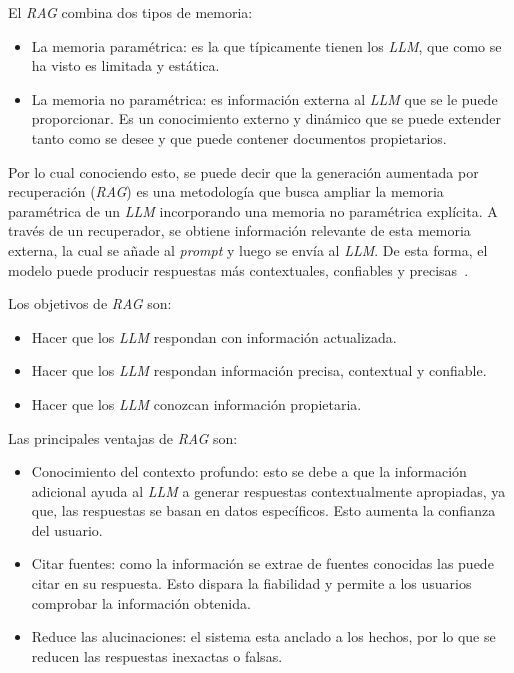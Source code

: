
El \textit{RAG} combina dos tipos de memoria:
\begin{itemize}
\tightlist
	\item La memoria paramétrica: es la que típicamente tienen los \textit{LLM}, que como se ha visto es limitada y estática. 
	\item La memoria no paramétrica: es información externa al \textit{LLM} que se le puede proporcionar. Es un conocimiento externo y dinámico que se puede extender tanto como se desee y que puede contener documentos propietarios.
\end{itemize}

Por lo cual conociendo esto, se puede decir que la generación aumentada por recuperación (\textit{RAG}) es una metodología que busca ampliar la memoria paramétrica de un \textit{LLM} incorporando una memoria no paramétrica explícita. A través de un recuperador, se obtiene información relevante de esta memoria externa, la cual se añade al \textit{prompt} y luego se envía al \textit{LLM}. De esta forma, el modelo puede producir respuestas más contextuales, confiables y precisas~\cite{book:RAG_SimpleGuide}.

Los objetivos de \textit{RAG} son:
\begin{itemize}
\tightlist
	\item Hacer que los \textit{LLM} respondan con información actualizada.
	\item Hacer que los \textit{LLM} respondan información precisa, contextual y confiable.
	\item Hacer que los \textit{LLM} conozcan información propietaria.
\end{itemize}

Las principales ventajas de \textit{RAG} son:
\begin{itemize}
\tightlist
	\item Conocimiento del contexto profundo: esto se debe a que la información adicional ayuda al \textit{LLM} a generar respuestas contextualmente apropiadas, ya que, las respuestas se basan en datos específicos. Esto aumenta la confianza del usuario.
	\item Citar fuentes: como la información se extrae de fuentes conocidas las puede citar en su respuesta. Esto dispara la fiabilidad y permite a los usuarios comprobar la información obtenida.
	\item Reduce las alucinaciones: el sistema esta anclado a los hechos, por lo que se reducen las respuestas inexactas o falsas. 
\end{itemize}

